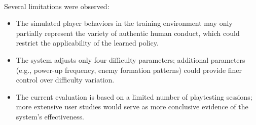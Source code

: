 \paragraph{} Several limitations were observed:

\begin{itemize}
	\item The simulated player behaviors in the training environment may only partially represent the variety of authentic human conduct, which could restrict the applicability of the learned policy.
	\item The system adjusts only four difficulty parameters; additional parameters (e.g., power-up frequency, enemy formation patterns) could provide finer control over difficulty variation.
	\item The current evaluation is based on a limited number of playtesting sessions; more extensive user studies would serve as more conclusive evidence of the system's effectiveness.
\end{itemize}
